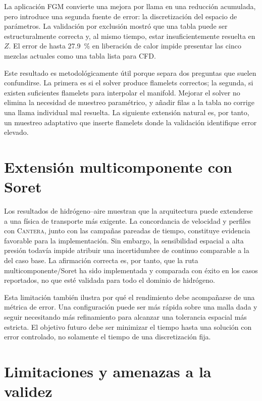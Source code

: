 \documentclass[12pt,a4paper,twoside,openany]{book}
\newcommand{\Cantera}{\textsc{Cantera}\xspace}
\begin{document}
La aplicación FGM convierte una mejora por llama en una reducción acumulada,
pero introduce una segunda fuente de error: la discretización del espacio de
parámetros. La validación por exclusión mostró que una tabla puede ser
estructuralmente correcta y, al mismo tiempo, estar insuficientemente resuelta
en \(Z\). El error de hasta \SI{27.9}{\percent} en liberación de calor impide
presentar las cinco mezclas actuales como una tabla lista para CFD.

Este resultado es metodológicamente útil porque separa dos preguntas que suelen
confundirse. La primera es si el solver produce flamelets correctos; la segunda,
si existen suficientes flamelets para interpolar el manifold. Mejorar el solver
no elimina la necesidad de muestreo paramétrico, y añadir filas a la tabla no
corrige una llama individual mal resuelta. La siguiente extensión natural es,
por tanto, un muestreo adaptativo que inserte flamelets donde la validación
identifique error elevado.

\section{Extensión multicomponente con Soret}

Los resultados de hidrógeno--aire muestran que la arquitectura puede extenderse
a una física de transporte más exigente. La concordancia de velocidad y perfiles
con \Cantera, junto con las campañas pareadas de tiempo, constituye evidencia
favorable para la implementación. Sin embargo, la sensibilidad espacial a alta
presión todavía impide atribuir una incertidumbre de continuo comparable a la
del caso base. La afirmación correcta es, por tanto, que la ruta
multicomponente/Soret ha sido implementada y comparada con éxito en los casos
reportados, no que esté validada para todo el dominio de hidrógeno.

Esta limitación también ilustra por qué el rendimiento debe acompañarse de una
métrica de error. Una configuración puede ser más rápida sobre una malla dada y
seguir necesitando más refinamiento para alcanzar una tolerancia espacial más
estricta. El objetivo futuro debe ser minimizar el tiempo hasta una solución con
error controlado, no solamente el tiempo de una discretización fija.

\section{Limitaciones y amenazas a la validez}
\end{document}
